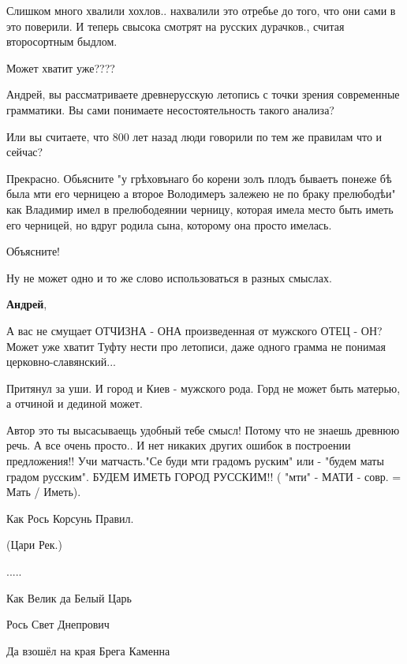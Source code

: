 \begin{itemize}
Слишком много хвалили хохлов.. нахвалили это отребье до того, что они сами в
это поверили. И теперь свысока смотрят на русских дурачков., считая
второсортным быдлом.

Может хватит уже????

\begin{itemize} %

Андрей, вы рассматриваете древнерусскую летопись с точки зрения современные
грамматики. Вы сами понимаете несостоятельность такого анализа?

Или вы считаете, что 800 лет назад люди говорили по тем же правилам что и
сейчас?

Прекрасно. Обьясните "у грѣховънаго бо корени золъ плодъ бываетъ понеже бѣ была
мти его черницею а второе Володимеръ залежею не по браку прелюбодѣи" как
Владимир имел в прелюбодеянии черницу, которая имела место быть иметь его
черницей, но вдруг родила сына, которому она просто имелась.

Объясните!

Ну не может одно и то же слово использоваться в разных смыслах.

\textbf{Андрей}, 

А вас не смущает ОТЧИЗНА - ОНА произведенная от мужского ОТЕЦ - ОН? Может уже
хватит Туфту нести про летописи, даже одного грамма не понимая
церковно-славянский...

\end{itemize} %


Притянул за уши. И город и Киев - мужского рода. Горд не может быть матерью, а
отчиной и дединой может.


Автор это ты высасываещь удобный тебе смысл! Потому что не знаешь древнюю речь.
А все очень просто.. И нет никаких других ошибок в построении предложения!! Учи
матчасть."Се буди мти градомъ руским" или - "будем маты градом русским". БУДЕМ
ИМЕТЬ ГОРОД РУССКИМ!! ( "мти" - МАТИ - совр. = Мать / Иметь).


Как Рось Корсунь Правил.

(Цари Рек.)

.....

Как Велик да Белый Царь

Рось Свет Днепрович

Да взошёл на края Брега Каменна


\end{itemize}
